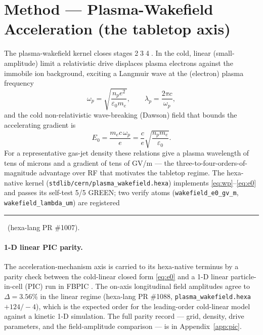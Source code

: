 \documentclass[11pt,a4paper]{article}
\newcommand{\tierdisc}[1]{\textcolor{#1}{\rule[0.05ex]{1.0ex}{1.0ex}}}
\newcommand{\tierGreen}{\tierdisc{green!60!black}}
\begin{document}
\section{Method --- Plasma-Wakefield Acceleration (the tabletop axis)}
\label{sec:plasma}

The plasma-wakefield kernel closes stages
\textcircled{\scriptsize 2}\textcircled{\scriptsize 3}\textcircled{\scriptsize 4}.
In the cold, linear (small-amplitude) limit a relativistic drive
displaces plasma electrons against the immobile ion background, exciting
a Langmuir wave at the (electron) plasma frequency
\citep{dawson1959,esarey2009lpa}
\begin{equation}
\omega_p = \sqrt{\frac{n_p e^{2}}{\varepsilon_0 m_e}},
\qquad
\lambda_p = \frac{2\pi c}{\omega_p},
\label{eq:wp}
\end{equation}
and the cold non-relativistic wave-breaking (Dawson) field that bounds
the accelerating gradient is
\begin{equation}
E_0 = \frac{m_e c\,\omega_p}{e}
    = \frac{c}{e}\sqrt{\frac{n_p m_e}{\varepsilon_0}}.
\label{eq:e0}
\end{equation}
For a representative gas-jet density these relations give a plasma
wavelength of tens of microns and a gradient of tens of \si{GV/m} ---
the three-to-four-orders-of-magnitude advantage over RF that motivates
the tabletop regime. The hexa-native kernel
(\verb|stdlib/cern/plasma_wakefield.hexa|) implements
\eqref{eq:wp}--\eqref{eq:e0} and passes its self-test 5/5 GREEN; two
verify atoms (\verb|wakefield_e0_gv_m|, \verb|wakefield_lambda_um|) are
registered \tierGreen\ (hexa-lang PR \#1007).

\paragraph{1-D linear PIC parity.} The acceleration-mechanism axis is
carried to its hexa-native terminus by a parity check between the
cold-linear closed form \eqref{eq:e0} and a 1-D linear
particle-in-cell (PIC) run in FBPIC \citep{lehe2016fbpic}. The on-axis
longitudinal field amplitudes agree to $\Delta = 3.56\%$ in the linear
regime (hexa-lang PR \#1088, \verb|plasma_wakefield.hexa| $+124/-4$),
which is the expected order for the leading-order cold-linear model
against a kinetic 1-D simulation. The full parity record --- grid,
density, drive parameters, and the field-amplitude comparison --- is in
Appendix~\ref{app:pic}.
\end{document}
